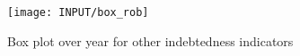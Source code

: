 \documentclass[a4paper, 11pt, onecolumn]{article}
\begin{document}
\begin{figure}[ht]
\raggedright
\texttt{[image: INPUT/box\_rob]}
\caption{Box plot over year for other indebtedness indicators}
\label{figure:debttrendrob}
\end{figure}






















\end{document}
